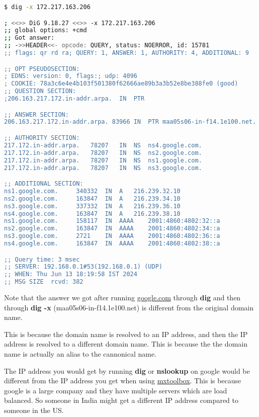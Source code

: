 \begin{lstlisting}[language=bash]
$ dig -x 172.217.163.206

; <<>> DiG 9.18.27 <<>> -x 172.217.163.206
;; global options: +cmd
;; Got answer:
;; ->>HEADER<<- opcode: QUERY, status: NOERROR, id: 15781
;; flags: qr rd ra; QUERY: 1, ANSWER: 1, AUTHORITY: 4, ADDITIONAL: 9

;; OPT PSEUDOSECTION:
; EDNS: version: 0, flags:; udp: 4096
; COOKIE: 78a3c6e4e4b103f501380f62666ae89b3a3b52e8be388fe0 (good)
;; QUESTION SECTION:
;206.163.217.172.in-addr.arpa.	IN	PTR

;; ANSWER SECTION:
206.163.217.172.in-addr.arpa. 83966 IN	PTR	maa05s06-in-f14.1e100.net.

;; AUTHORITY SECTION:
217.172.in-addr.arpa.	78207	IN	NS	ns4.google.com.
217.172.in-addr.arpa.	78207	IN	NS	ns2.google.com.
217.172.in-addr.arpa.	78207	IN	NS	ns1.google.com.
217.172.in-addr.arpa.	78207	IN	NS	ns3.google.com.

;; ADDITIONAL SECTION:
ns1.google.com.		340332	IN	A	216.239.32.10
ns2.google.com.		163847	IN	A	216.239.34.10
ns3.google.com.		337332	IN	A	216.239.36.10
ns4.google.com.		163847	IN	A	216.239.38.10
ns1.google.com.		158117	IN	AAAA	2001:4860:4802:32::a
ns2.google.com.		163847	IN	AAAA	2001:4860:4802:34::a
ns3.google.com.		2721	IN	AAAA	2001:4860:4802:36::a
ns4.google.com.		163847	IN	AAAA	2001:4860:4802:38::a

;; Query time: 3 msec
;; SERVER: 192.168.0.1#53(192.168.0.1) (UDP)
;; WHEN: Thu Jun 13 18:19:58 IST 2024
;; MSG SIZE  rcvd: 382
\end{lstlisting}

Note that the answer we got after running
\href{https://google.com}{google.com} through
\textbf{dig} and then through \textbf{dig -x}
(maa05s06-in-f14.1e100.net) is
different from the original domain name.

This is because the domain name is resolved to
an IP address, and then the IP address is resolved
to a different domain name. This is because the
the domain name is actually an alias to the
cannonical name.

\begin{remark}
  The IP address you would get by running
  \textbf{dig} or \textbf{nslookup} on google
  would be different from the IP address you
  get when using \href{https://mxtoolbox.com/}{mxtoolbox}.
  This is because google is a large company and
  they have multiple servers which are load balanced.
  So someone in India might get a different IP address
  compared to someone in the US.
\end{remark}

